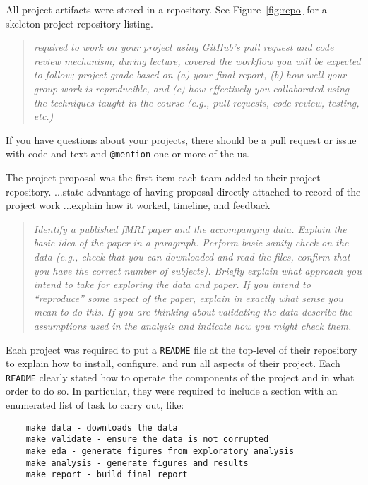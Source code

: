 All project artifacts were stored in a repository.
See Figure~\ref{fig:repo} for a skeleton project repository listing.

\begin{quote}\emph{
required to work on your project using GitHub's pull request and code review mechanism;
during lecture, covered the workflow you will be expected to follow;
project grade based on (a) your final report, (b) how well your group work is
reproducible, and (c) how effectively you collaborated using the techniques
taught in the course (e.g., pull requests, code review, testing, etc.)
}\end{quote}


If you have questions about your projects, there should be a pull request
or issue with code and text and \texttt{@mention} one or more of the us.

The project proposal was the first item each team added to their project repository.
...state advantage of having proposal directly attached to record of the
project work
...explain how it worked, timeline, and feedback

\begin{quote}\emph{
Identify a published fMRI paper and the accompanying data.
Explain the basic idea of the paper in a paragraph.
Perform basic sanity check on the data
(e.g., check that you can downloaded and read the files,
confirm that you have the correct number of subjects).
Briefly explain what approach you intend to take for exploring
the data and paper.  If you intend to ``reproduce'' some aspect of the paper,
explain in exactly what sense you mean to do this.  If you are thinking about
validating the data describe the assumptions used in the analysis and indicate
how you might check them.
}\end{quote}

Each project was required to put a \texttt{README} file at the top-level
of their repository to explain how to install, configure,
and run all aspects of their project.
Each \texttt{README} clearly stated  how to operate the
components of the project and in what order to do so.
In particular, they were required to include a section with
an enumerated list of task to carry out, like:
\begin{verbatim}
    make data - downloads the data 
    make validate - ensure the data is not corrupted
    make eda - generate figures from exploratory analysis
    make analysis - generate figures and results
    make report - build final report
\end{verbatim}

